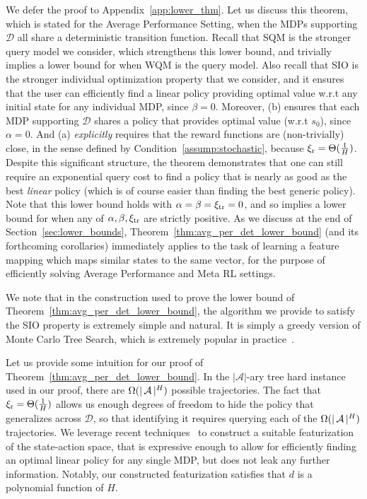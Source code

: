 \documentclass[11pt,twoside]{article}
\begin{document}
\noindent We defer the proof to Appendix~\ref{app:lower_thm}. Let us discuss this theorem, which is stated for the Average Performance Setting, when the MDPs supporting $\mathcal{D}$ all share a deterministic transition function. Recall that SQM is the stronger query model we consider, which strengthens this lower bound, and trivially implies a lower bound for when WQM is the query model. Also recall that SIO is the stronger individual optimization property that we consider, and it ensures that the user can efficiently find a linear policy providing optimal value w.r.t any initial state for any individual MDP, since $\beta = 0$. Moreover, \weakprox{} (b) ensures that each MDP supporting $\mathcal{D}$ shares a policy that provides optimal value (w.r.t $s_0$), since $\alpha = 0$. And \weakprox{} (a) \emph{explicitly} requires that the reward functions are (non-trivially) close, in the sense defined by Condition~\ref{assump:stochastic}, because $\operatorname{\xi_r} = \Theta(\frac{1}{H})$. Despite this significant structure, the theorem demonstrates that one can still require an exponential query cost to find a policy that is nearly as good as the best \emph{linear} policy (which is of course easier than finding the best generic policy). Note that this lower bound holds with $\alpha=\beta=\operatorname{\xi_{tr}}=0$, and so implies a lower bound for when any of $\alpha,\beta,\operatorname{\xi_{tr}}$ are strictly positive. As we discuss at the end of Section~\ref{sec:lower_bounds}, Theorem~\ref{thm:avg_per_det_lower_bound} (and its forthcoming corollaries) immediately applies to the task of learning a feature mapping which maps similar states to the same vector, for the purpose of efficiently solving Average Performance and Meta RL settings.

We note that in the construction used to prove the lower bound of Theorem~\ref{thm:avg_per_det_lower_bound}, the algorithm we provide to satisfy the SIO property is extremely simple and natural. It is simply a greedy version of Monte Carlo Tree Search, which is extremely popular in practice~\citep{kocsis06, silver17}.

Let us provide some intuition for our proof of Theorem~\ref{thm:avg_per_det_lower_bound}. In the $\vert \mathcal{A} \vert$-ary tree hard instance used in our proof, there are $\Omega(\vert \operatorname{\mathcal{A}} \vert^H)$ possible trajectories. The fact that $\operatorname{\xi_r}=\Theta(\frac{1}{H})$ allows us enough degrees of freedom to hide the policy that generalizes across $\mathcal{D}$, so that identifying it requires querying each of the $\Omega(\vert \operatorname{\mathcal{A}} \vert^H)$ trajectories. We leverage recent techniques~\citep{du20, wang20} to construct a suitable featurization of the state-action space, that is expressive enough to allow for efficiently finding an optimal linear policy for any single MDP, but does not leak any further information. Notably, our constructed featurization satisfies that $d$ is a polynomial function of $H$.
\end{document}
